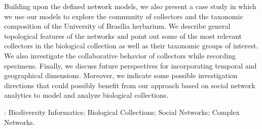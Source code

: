 \documentclass[
	12pt,				%
	openright,			%
	oneside,			%
	a4paper,			%
	sumario=tradicional,%
	french,				%
	spanish,			%
	brazil,				%
    english
	]{abntex2}
\begin{document}
\begin{resumo}
\begin{small}
Building upon the defined network models, we also present a case study in which we use our models to explore the community of collectors and the taxonomic composition of the University of Brasília herbarium. We describe general topological features of the networks and point out some of the most relevant collectors in the biological collection as well as their taxonomic groups of interest. We also investigate the collaborative behavior of collectors while recording specimens.
Finally, we discuss future perspectives for incorporating temporal and geographical dimensions. Moreover, we indicate some possible investigation directions that could possibly benefit from our approach based on social network analytics to model and analyze biological collections.

\textbf{\palavrasChave}: Biodiversity Informatics; Biological Collections; Social Networks; Complex Networks.
\end{small}
\end{resumo}

%
\end{document}
